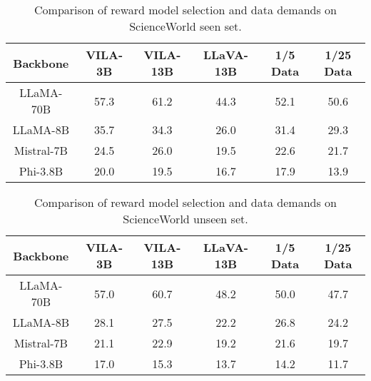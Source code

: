\begin{table*}[!h]
    \centering
    \begin{tabular}{cccccc}
    \toprule
    Backbone  & VILA-3B & VILA-13B & LLaVA-13B &1/5 Data   &1/25 Data \\
    \midrule
LLaMA-70B &57.3	&61.2	&44.3	&52.1	&50.6  \\
    LLaMA-8B  &35.7	&34.3	&26.0	&31.4	&29.3   \\
    Mistral-7B &24.5	&26.0	&19.5	&22.6	&21.7    \\
    Phi-3.8B& 20.0	&19.5	&16.7	&17.9	&13.9   \\
    \bottomrule
    \end{tabular}
    \caption{Comparison of reward model selection and data demands on ScienceWorld seen set. 
    }
    \label{tab:Efficiency1}
\end{table*}

\begin{table*}[!h]
    \centering
    \begin{tabular}{cccccc}
    \toprule
    Backbone  & VILA-3B & VILA-13B & LLaVA-13B &1/5 Data   &1/25 Data \\
    \midrule
    LLaMA-70B &57.0	&60.7	&48.2	&50.0	&47.7  \\
    LLaMA-8B  &28.1	&27.5	&22.2	&26.8	&24.2   \\
    Mistral-7B &21.1	&22.9	&19.2	&21.6	&19.7   \\
    Phi-3.8B& 17.0	&15.3	&13.7	&14.2	&11.7  \\
    \bottomrule
    \end{tabular}
    \caption{Comparison of reward model selection and data demands on ScienceWorld unseen set.} 
    \label{tab:Efficiency2}
\end{table*}
